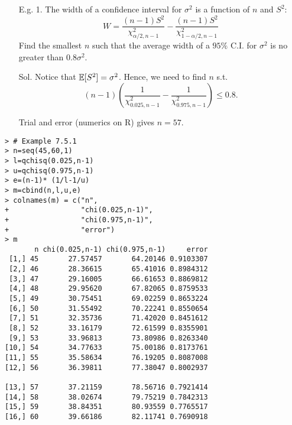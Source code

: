 \begin{frame}

\begin{enumerate}
\item[E.g. 1.] The width of a confidence interval for $\sigma^2$ is a function of $n$ and $S^2$:
\[
W=\frac{(n-1)S^2}{\chi^2_{\alpha/2,n-1}}-\frac{(n-1)S^2}{\chi^2_{1-\alpha/2,n-1}}
\]
Find the smallest $n$ such that the average width of a $95\%$ C.I. for $\sigma^2$ is no greater than $0.8 \sigma^2$.
\vfill
\item[Sol.] Notice that $\mathbb{E}[S^2]=\sigma^2$. Hence, we need to find $n$ s.t.
	\[
		(n-1)\left(\frac{1}{\chi_{0.025,n-1}^2} - \frac{1}{\chi_{0.975,n-1}^2}\right)\le 0.8.
	\]
\item[] Trial and error (numerics on R) gives $n=57$.
\end{enumerate}
\end{frame}
\begin{frame}[fragile]
\begin{center}
\begin{minipage}{0.6\textwidth}
\begin{lstlisting}
> # Example 7.5.1
> n=seq(45,60,1)
> l=qchisq(0.025,n-1)
> u=qchisq(0.975,n-1)
> e=(n-1)* (1/l-1/u)
> m=cbind(n,l,u,e)
> colnames(m) = c("n",
+                 "chi(0.025,n-1)",
+                 "chi(0.975,n-1)",
+                 "error")
> m
       n chi(0.025,n-1) chi(0.975,n-1)     error
 [1,] 45       27.57457       64.20146 0.9103307
 [2,] 46       28.36615       65.41016 0.8984312
 [3,] 47       29.16005       66.61653 0.8869812
 [4,] 48       29.95620       67.82065 0.8759533
 [5,] 49       30.75451       69.02259 0.8653224
 [6,] 50       31.55492       70.22241 0.8550654
 [7,] 51       32.35736       71.42020 0.8451612
 [8,] 52       33.16179       72.61599 0.8355901
 [9,] 53       33.96813       73.80986 0.8263340
[10,] 54       34.77633       75.00186 0.8173761
[11,] 55       35.58634       76.19205 0.8087008
[12,] 56       36.39811       77.38047 0.8002937

[13,] 57       37.21159       78.56716 0.7921414
[14,] 58       38.02674       79.75219 0.7842313
[15,] 59       38.84351       80.93559 0.7765517
[16,] 60       39.66186       82.11741 0.7690918
\end{lstlisting}
\end{minipage}
	\end{center}
\end{frame}
